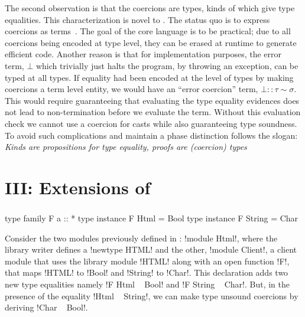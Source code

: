 \documentclass[screen,nonacm,manuscript,review]{acmart} %
\begin{document}
The second observation is that the coercions are types, kinds of which
give type equalities. This characterization is novel to \SFC.
The status quo is to express coercions as
terms~\cite{sheard_meta-programming_2008,weirich_type-safe_2000,baars_typing_2002,
neis_non-parametric_2011}.
The goal of the core language is to be practical;
due to all coercions being encoded at type level, they can be erased
at runtime to generate efficient code. Another reason is
that for implementation purposes, the error term, $\bot$ which
trivially just halts the program, by throwing an exception, can be
typed at all types. If equality had been encoded at the level of types
by making coercions a term level entity, we would have an ``error
coercion'' term, $\bot :: \tau \sim \sigma$. This would require
guaranteeing that evaluating the type equality evidences does not lead
to non-termination before we evaluate the term.
Without this evaluation check we cannot use a coercion for casts while
also guaranteeing type soundness. To avoid such complications and maintain
a phase distinction \SFC follows the slogan:
\emph{Kinds are propositions for type equality, proofs are (coercion) types}


\part{III: Extensions of \SFC}\label{part:III}
\section{\SFR}\label{sec:sfr} %

\begin{CenteredBox}
  \begin{code}
    type family F a :: *
    type instance F Html = Bool
    type instance F String = Char
  \end{code}
\end{CenteredBox}

Consider the two modules previously defined in : !module Html!, where the library writer defines a !newtype HTML! and the other, !module Client!, a client module that uses the library module !HTML! along with an open function !F!, that maps !HTML! to !Bool! and !String! to !Char!. This declaration adds two new type equalities namely !F Html ~ Bool! and !F String ~ Char!. But, in the presence of the equality !Html ~ String!, we can make type unsound coercions by deriving !Char ~ Bool!.
\end{document}
